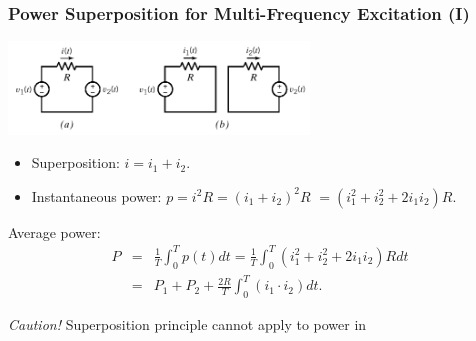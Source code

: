 \documentclass{beamer}
\begin{document}
\begin{frame}[fragile]
\frametitle{Power Superposition for Multi-Frequency Excitation (I)}

\begin{center}
\includegraphics[width=0.6\textwidth]{src/super1.png}
\end{center}

\begin{itemize}
\item Superposition: $i = i_1 + i_2$.
\item Instantaneous power: $p = i^2 R = (i_1 + i_2)^2 R$
$=(i_1^2 + i_2^2 + 2 i_1 i_2) R$.
\end{itemize}

Average power: 
\begin{eqnarray}
P &=& \frac{1}{T} \int_{0}^T p(t) dt = \frac{1}{T} \int_{0}^T (i_1^2 + i_2^2 + 2 i_1 i_2) R dt
\nonumber \\
&=& P_1 + P_2 + \frac{2 R}{T} \int_{0}^T (i_1 \cdot i_2) dt
\nonumber .
\end{eqnarray}

\emph{Caution!} Superposition principle cannot apply to power in 
\end{frame}

\end{document}
